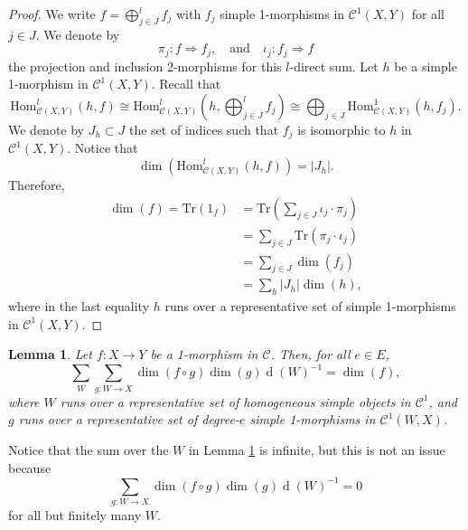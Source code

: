 \documentclass[a4paper, oneside]{amsart}
\DeclareMathOperator{\wdim}{d}
\numberwithin{equation}{subsection}
\theoremstyle{referencedlemma}
\theoremstyle{plain} %
\newtheorem{lem}[equation]{Lemma}
\theoremstyle{remark}
\begin{document}
\begin{proof}
We write $ f = \bigoplus^l_{j\in J} f_j$ with $f_j$ simple 1-morphisms in $\mathcal{C}^1(X,Y)$ for all $j\in J$.  We denote by
$$
\pi_j \colon f \Rightarrow f_j, \quad \text{and} \quad \iota_j \colon f_j \Rightarrow f
$$
the projection and inclusion 2-morphisms for this $l$-direct sum. Let $h$ be a simple 1-morphism in $\mathcal{C}^1(X,Y)$. Recall that 
$$
\mathrm{Hom}_{\mathcal{C}(X,Y)}^l(h,f) \cong \mathrm{Hom}_{\mathcal{C}(X,Y)}^l(h, \bigoplus_{j\in J}^l f_j) \cong  \bigoplus_{j\in J} \mathrm{Hom}_{\mathcal{C}(X,Y)}^1(h,f_j).
$$ 
We denote by $J_h\subset J$ the set of indices such that $f_j$ is isomorphic to $h$ in $\mathcal{C}^1(X,Y)$.  Notice that 
$$
\dim(\mathrm{Hom}_{\mathcal{C}(X,Y)}^l(h,f)) = \lvert J_h\rvert.
$$
Therefore, 
\begin{align*}
\dim(f) = \mathrm{Tr}(1_f) &= \mathrm{Tr}(\sum_{j\in J} \iota_j \cdot \pi_j)\\
&= \sum_{j\in J}\mathrm{Tr}(\pi_j\cdot \iota_j)\\
&= \sum_{j\in J} \dim(f_j)\\
& = \sum_{h} \lvert J_h\rvert \dim(h),
\end{align*}
where in the last equality $h$ runs over a representative set of simple 1-morphisms in $\mathcal{C}^1(X,Y)$. 
\end{proof}

\begin{lem}\label{Lemma_B3}
Let $f\colon X\to Y$ be a 1-morphism in $\mathcal{C}$. Then, for all $e\in E$,
$$
\sum_W \sum_{g\colon W\to X} \dim(f\circ g)\dim(g) \wdim(W)^{-1} = \dim(f),
$$
where $W$ runs over a representative set of homogeneous simple objects in $\mathcal{C}^1$, and $g$ runs over a representative set of degree-$e$ simple 1-morphisms in $\mathcal{C}^1(W,X)$. 
\end{lem}

Notice that the sum over the $W$ in Lemma \ref{Lemma_B3} is infinite, but this is not an issue because
$$
\sum_{g\colon W\to X} \dim(f\circ g)\dim(g) \wdim(W)^{-1}= 0
$$
for all but finitely many $W$. 
\end{document}

